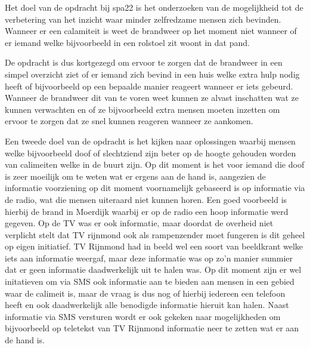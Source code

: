 Het doel van de opdracht bij spa22 is het onderzoeken van de mogelijkheid tot de verbetering van het inzicht waar minder zelfredzame mensen zich bevinden. Wanneer er een calamiteit is weet de brandweer op het moment niet wanneer of er iemand welke bijvoorbeeld in een rolstoel zit woont in dat pand.

De opdracht is dus kortgezegd om ervoor te zorgen dat de brandweer in een simpel overzicht ziet of er iemand zich bevind in een huis welke extra hulp nodig heeft of bijvoorbeeld op een bepaalde manier reageert wanneer er iets gebeurd. Wanneer de brandweer dit van te voren weet kunnen ze alvast inschatten wat ze kunnen verwachten en of ze bijvoorbeeld extra mensen moeten inzetten om ervoor te zorgen dat ze snel kunnen reageren wanneer ze aankomen.

Een tweede doel van de opdracht is het kijken naar oplossingen waarbij mensen welke bijvoorbeeld doof of slechtziend zijn beter op de hoogte gehouden worden van calimeiten welke in de buurt zijn. Op dit moment is het voor iemand die doof is zeer moeilijk om te weten wat er ergens aan de hand is, aangezien de informatie voorziening op dit moment voornamelijk gebaseerd is op informatie via de radio, wat die mensen uiteraard niet kunnen horen.
Een goed voorbeeld is hierbij de brand in Moerdijk waarbij er op de radio een hoop informatie werd gegeven. Op de TV was er ook informatie, maar doordat de overheid niet verplicht stelt dat TV rijnmond ook als rampenzender moet fungeren is dit geheel op eigen initiatief. TV Rijnmond had in beeld wel een soort van beeldkrant welke iets aan informatie weergaf, maar deze informatie was op zo'n manier summier dat er geen informatie daadwerkelijk uit te halen was.
Op dit moment zijn er wel initatieven om via SMS ook informatie aan te bieden aan mensen in een gebied waar de calimeit is, maar de vraag is dus nog of hierbij iedereen een telefoon heeft en ook daadwerkelijk alle benodigde informatie hieruit kan halen. 
Naast informatie via SMS versturen wordt er ook gekeken naar mogelijkheden om bijvoorbeeld op teletekst van TV Rijnmond informatie neer te zetten wat er aan de hand is.


